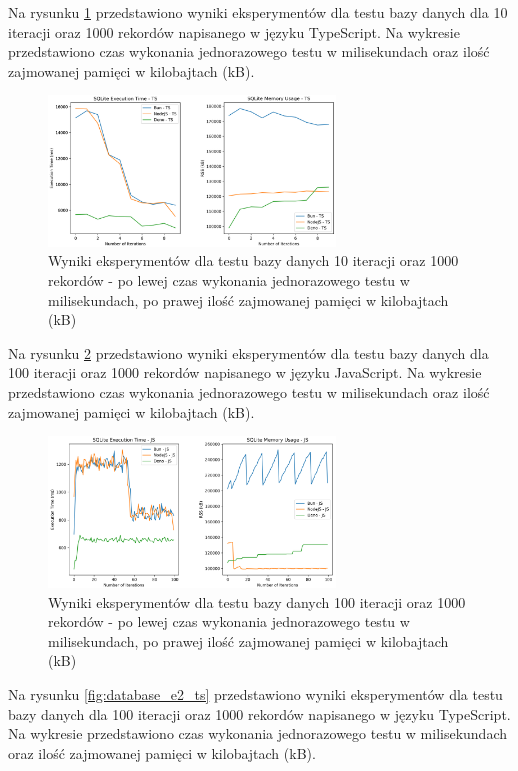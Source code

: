 Na rysunku \ref{fig:database_e1_ts} przedstawiono wyniki eksperymentów dla testu bazy danych dla 10 iteracji oraz 1000 rekordów napisanego w języku TypeScript. Na wykresie przedstawiono czas wykonania jednorazowego testu w milisekundach oraz ilość zajmowanej pamięci w kilobajtach (kB).

\begin{figure}[H]
  \centering
  \includegraphics[width=0.68\textwidth]{Figures/database/sqlite_10_1000_ts.png}
  \caption{Wyniki eksperymentów dla testu bazy danych 10 iteracji oraz 1000 rekordów - po lewej czas wykonania jednorazowego testu w milisekundach, po prawej ilość zajmowanej pamięci w kilobajtach (kB)}
  \label{fig:database_e1_ts}
\end{figure}

Na rysunku \ref{fig:database_e2_js} przedstawiono wyniki eksperymentów dla testu bazy danych dla 100 iteracji oraz 1000 rekordów napisanego w języku JavaScript. Na wykresie przedstawiono czas wykonania jednorazowego testu w milisekundach oraz ilość zajmowanej pamięci w kilobajtach (kB).

\begin{figure}[H]
  \centering
  \includegraphics[width=0.68\textwidth]{Figures/database/sqlite_100_1000_js.png}
  \caption{Wyniki eksperymentów dla testu bazy danych 100 iteracji oraz 1000 rekordów - po lewej czas wykonania jednorazowego testu w milisekundach, po prawej ilość zajmowanej pamięci w kilobajtach (kB)}
  \label{fig:database_e2_js}
\end{figure}

Na rysunku \ref{fig:database_e2_ts} przedstawiono wyniki eksperymentów dla testu bazy danych dla 100 iteracji oraz 1000 rekordów napisanego w języku TypeScript. Na wykresie przedstawiono czas wykonania jednorazowego testu w milisekundach oraz ilość zajmowanej pamięci w kilobajtach (kB).

